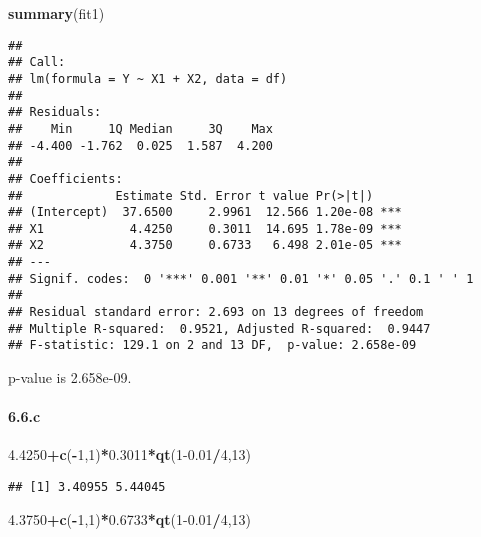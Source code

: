\documentclass[]{article}
\newenvironment{Shaded}{\begin{snugshade}}{\end{snugshade}}
\newcommand{\DecValTok}[1]{\textcolor[rgb]{0.00,0.00,0.81}{#1}}
\newcommand{\FloatTok}[1]{\textcolor[rgb]{0.00,0.00,0.81}{#1}}
\newcommand{\KeywordTok}[1]{\textcolor[rgb]{0.13,0.29,0.53}{\textbf{#1}}}
\newcommand{\NormalTok}[1]{#1}
\newcommand{\OperatorTok}[1]{\textcolor[rgb]{0.81,0.36,0.00}{\textbf{#1}}}
\let\oldparagraph\paragraph
\renewcommand{\paragraph}[1]{\oldparagraph{#1}\mbox{}}
\begin{document}
\begin{Shaded}
\begin{Highlighting}[]
\KeywordTok{summary}\NormalTok{(fit1)}
\end{Highlighting}
\end{Shaded}

\begin{verbatim}
## 
## Call:
## lm(formula = Y ~ X1 + X2, data = df)
## 
## Residuals:
##    Min     1Q Median     3Q    Max 
## -4.400 -1.762  0.025  1.587  4.200 
## 
## Coefficients:
##             Estimate Std. Error t value Pr(>|t|)    
## (Intercept)  37.6500     2.9961  12.566 1.20e-08 ***
## X1            4.4250     0.3011  14.695 1.78e-09 ***
## X2            4.3750     0.6733   6.498 2.01e-05 ***
## ---
## Signif. codes:  0 '***' 0.001 '**' 0.01 '*' 0.05 '.' 0.1 ' ' 1
## 
## Residual standard error: 2.693 on 13 degrees of freedom
## Multiple R-squared:  0.9521, Adjusted R-squared:  0.9447 
## F-statistic: 129.1 on 2 and 13 DF,  p-value: 2.658e-09
\end{verbatim}

p-value is 2.658e-09.

\hypertarget{c-1}{%
\paragraph{6.6.c}\label{c-1}}

\begin{Shaded}
\begin{Highlighting}[]
\FloatTok{4.4250}\OperatorTok{+}\KeywordTok{c}\NormalTok{(}\OperatorTok{-}\DecValTok{1}\NormalTok{,}\DecValTok{1}\NormalTok{)}\OperatorTok{*}\FloatTok{0.3011}\OperatorTok{*}\KeywordTok{qt}\NormalTok{(}\DecValTok{1}\FloatTok{-0.01}\OperatorTok{/}\DecValTok{4}\NormalTok{,}\DecValTok{13}\NormalTok{)}
\end{Highlighting}
\end{Shaded}

\begin{verbatim}
## [1] 3.40955 5.44045
\end{verbatim}

\begin{Shaded}
\begin{Highlighting}[]
\FloatTok{4.3750}\OperatorTok{+}\KeywordTok{c}\NormalTok{(}\OperatorTok{-}\DecValTok{1}\NormalTok{,}\DecValTok{1}\NormalTok{)}\OperatorTok{*}\FloatTok{0.6733}\OperatorTok{*}\KeywordTok{qt}\NormalTok{(}\DecValTok{1}\FloatTok{-0.01}\OperatorTok{/}\DecValTok{4}\NormalTok{,}\DecValTok{13}\NormalTok{)}
\end{Highlighting}
\end{Shaded}
\end{document}
